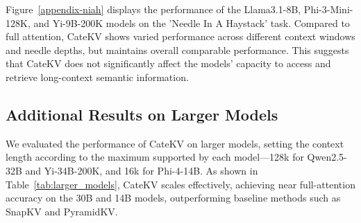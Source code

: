 Figure~\ref{appendix-niah} displays the performance of the Llama3.1-8B, Phi-3-Mini-128K, and Yi-9B-200K models on the 'Needle In A Haystack' task. Compared to full attention, CateKV shows varied performance across different context windows and needle depths, but maintains overall comparable performance. This suggests that CateKV does not significantly affect the models' capacity to access and retrieve long-context semantic information.

\subsection{Additional Results on Larger Models}
We evaluated the performance of CateKV on larger models, setting the context length according to the maximum supported by each model—128k for Qwen2.5-32B and Yi-34B-200K, and 16k for Phi-4-14B. As shown in Table~\ref{tab:larger_models}, CateKV scales effectively, achieving near full-attention accuracy on the 30B and 14B models, outperforming baseline methods such as SnapKV and PyramidKV.




